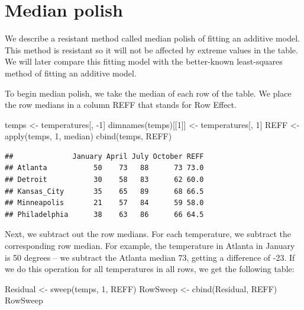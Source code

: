 \documentclass[
]{book}
\newenvironment{Shaded}{\begin{snugshade}}{\end{snugshade}}
\newcommand{\DecValTok}[1]{\textcolor[rgb]{0.00,0.00,0.81}{#1}}
\newcommand{\FunctionTok}[1]{\textcolor[rgb]{0.00,0.00,0.00}{#1}}
\newcommand{\NormalTok}[1]{#1}
\newcommand{\OtherTok}[1]{\textcolor[rgb]{0.56,0.35,0.01}{#1}}
\newcommand{\SpecialCharTok}[1]{\textcolor[rgb]{0.00,0.00,0.00}{#1}}
\begin{document}
\hypertarget{median-polish-1}{%
\section{Median polish}\label{median-polish-1}}

We describe a resistant method called median polish of fitting an additive model. This method is resistant so it will not be affected by extreme values in the table. We will later compare this fitting model with the better-known least-squares method of fitting an additive model.

To begin median polish, we take the median of each row of the table. We place the row medians in a column REFF that stands for Row Effect.

\begin{Shaded}
\begin{Highlighting}[]
\NormalTok{temps }\OtherTok{\textless{}{-}}\NormalTok{ temperatures[, }\SpecialCharTok{{-}}\DecValTok{1}\NormalTok{]}
\FunctionTok{dimnames}\NormalTok{(temps)[[}\DecValTok{1}\NormalTok{]] }\OtherTok{\textless{}{-}}\NormalTok{ temperatures[, }\DecValTok{1}\NormalTok{]}
\NormalTok{REFF }\OtherTok{\textless{}{-}} \FunctionTok{apply}\NormalTok{(temps, }\DecValTok{1}\NormalTok{, median)}
\FunctionTok{cbind}\NormalTok{(temps, REFF)}
\end{Highlighting}
\end{Shaded}

\begin{verbatim}
##              January April July October REFF
## Atlanta           50    73   88      73 73.0
## Detroit           30    58   83      62 60.0
## Kansas_City       35    65   89      68 66.5
## Minneapolis       21    57   84      59 58.0
## Philadelphia      38    63   86      66 64.5
\end{verbatim}

Next, we subtract out the row medians. For each temperature, we subtract the corresponding row median. For example, the temperature in Atlanta in January is 50 degrees -- we subtract the Atlanta median 73, getting a difference of -23. If we do this operation for all temperatures in all rows, we get the following table:

\begin{Shaded}
\begin{Highlighting}[]
\NormalTok{Residual }\OtherTok{\textless{}{-}} \FunctionTok{sweep}\NormalTok{(temps, }\DecValTok{1}\NormalTok{, REFF)}
\NormalTok{RowSweep }\OtherTok{\textless{}{-}} \FunctionTok{cbind}\NormalTok{(Residual, REFF)}
\NormalTok{RowSweep}
\end{Highlighting}
\end{Shaded}
\end{document}

